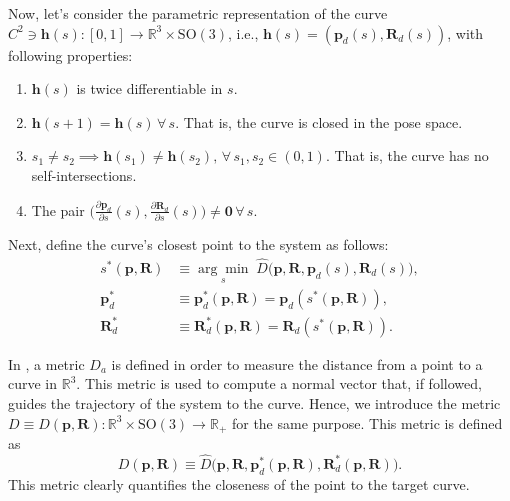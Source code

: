 Now, let's consider the parametric representation of the curve $C^2\ni\mathbf{h}(s):[0,1]\to\mathbb{R}^3\times \text{SO}(3)$, i.e., $\mathbf{h}(s)=(\mathbf{p}_d(s), \mathbf{R}_d(s))$, with following properties:
\begin{enumerate}[label=\roman*]
    \item $\mathbf{h}(s)$ is twice differentiable in $s$.
    \item $\mathbf{h}(s+1) = \mathbf{h}(s)\,\forall\, s$. That is, the curve is closed in the pose space.
    \item $s_1\neq s_2\implies \mathbf{h}(s_1)\neq\mathbf{h}(s_2),\,\forall\, s_1,s_2\in(0, 1)$. That is, the curve has no self-intersections.
    \item The pair $\Big(\frac{\partial \mathbf{p}_d}{\partial s}(s),  \frac{\partial \mathbf{R}_d}{\partial s}(s)\Big) \neq \mathbf{0}\, \forall\, s$. \label{prop:tangentenaonula}
\end{enumerate}
Next, define the curve's closest point to the system as follows:
\begin{align}
    s^*(\mathbf{p},\mathbf{R}) &\equiv \underset{s}{\arg\min}\;\widehat{D}\big(\mathbf{p}, \mathbf{R}, \mathbf{p}_d(s), \mathbf{R}_d(s)\big),\label{eq:otmproblemsStar}\\
    \mathbf{p}_d^*&\equiv\mathbf{p}_d^*(\mathbf{p},\mathbf{R}) = \mathbf{p}_d\left(s^*\left(\mathbf{p},\mathbf{R}\right)\right),\\
    \mathbf{R}_d^*&\equiv\mathbf{R}_d^*(\mathbf{p},\mathbf{R}) = \mathbf{R}_d\left(s^*\left(\mathbf{p},\mathbf{R}\right)\right).
\end{align}

In \cite{Rezende2022}, a metric $D_a$ is defined in order to measure the distance from a point to a curve in $\mathbb{R}^3$. This metric is used to compute a normal vector that, if followed, guides the trajectory of the system to the curve. Hence, we introduce the metric $D\equiv D(\mathbf{p}, \mathbf{R}):\mathbb{R}^3\times \text{SO}(3)\to\mathbb{R}_+$ for the same purpose. This metric is defined as
\begin{equation}
    D(\mathbf{p}, \mathbf{R}) \equiv \widehat{D}\big(\mathbf{p}, \mathbf{R}, \mathbf{p}_d^*(\mathbf{p}, \mathbf{R}), \mathbf{R}_d^*(\mathbf{p}, \mathbf{R})\big).\label{eq:distancefunc}
\end{equation}
This metric clearly quantifies the closeness of the point to the target curve.

